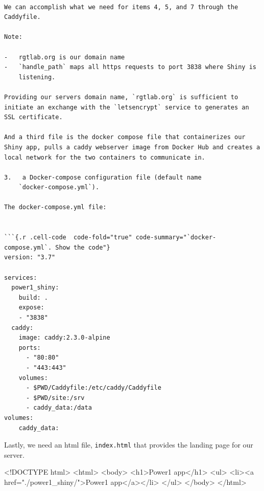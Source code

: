 \documentclass[
  letterpaper,
  DIV=11,
  numbers=noendperiod,
  oneside]{scrartcl}
\newenvironment{Shaded}{\begin{snugshade}}{\end{snugshade}}
\newcommand{\ErrorTok}[1]{\textcolor[rgb]{0.68,0.00,0.00}{#1}}
\newcommand{\NormalTok}[1]{\textcolor[rgb]{0.00,0.23,0.31}{#1}}
\newcommand{\OtherTok}[1]{\textcolor[rgb]{0.00,0.23,0.31}{#1}}
\newcommand{\SpecialCharTok}[1]{\textcolor[rgb]{0.37,0.37,0.37}{#1}}
\newcommand{\StringTok}[1]{\textcolor[rgb]{0.13,0.47,0.30}{#1}}
\begin{document}
\begin{verbatim}

We can accomplish what we need for items 4, 5, and 7 through the
Caddyfile.

Note:

-   rgtlab.org is our domain name
-   `handle_path` maps all https requests to port 3838 where Shiny is
    listening.

Providing our servers domain name, `rgtlab.org` is sufficient to
initiate an exchange with the `letsencrypt` service to generates an SSL certificate.

And a third file is the docker compose file that containerizes our
Shiny app, pulls a caddy webserver image from Docker Hub and creates a
local network for the two containers to communicate in.

3.   a Docker-compose configuration file (default name
    `docker-compose.yml`).

The docker-compose.yml file:


```{.r .cell-code  code-fold="true" code-summary="`docker-compose.yml`. Show the code"}
version: "3.7"

services:
  power1_shiny:
    build: .
    expose:
    - "3838"
  caddy:
    image: caddy:2.3.0-alpine
    ports:
      - "80:80"
      - "443:443"
    volumes:
      - $PWD/Caddyfile:/etc/caddy/Caddyfile
      - $PWD/site:/srv
      - caddy_data:/data
volumes:
    caddy_data:
\end{verbatim}

Lastly, we need an html file, \texttt{index.html} that provides the
landing page for our server.

\begin{Shaded}
\begin{Highlighting}[]
\SpecialCharTok{\textless{}!}\NormalTok{DOCTYPE html}\SpecialCharTok{\textgreater{}}
\ErrorTok{\textless{}}\NormalTok{html}\SpecialCharTok{\textgreater{}}
  \ErrorTok{\textless{}}\NormalTok{body}\SpecialCharTok{\textgreater{}}
    \ErrorTok{\textless{}}\NormalTok{h1}\SpecialCharTok{\textgreater{}}\NormalTok{Power1 app}\SpecialCharTok{\textless{}}\ErrorTok{/}\NormalTok{h1}\SpecialCharTok{\textgreater{}}
    \ErrorTok{\textless{}}\NormalTok{ul}\SpecialCharTok{\textgreater{}}
      \ErrorTok{\textless{}}\NormalTok{li}\SpecialCharTok{\textgreater{}}\ErrorTok{\textless{}}\NormalTok{a href}\OtherTok{=}\StringTok{"./power1\_shiny/"}\SpecialCharTok{\textgreater{}}\NormalTok{Power1 app}\SpecialCharTok{\textless{}}\ErrorTok{/}\NormalTok{a}\SpecialCharTok{\textgreater{}}\ErrorTok{\textless{}/}\NormalTok{li}\SpecialCharTok{\textgreater{}}
    \ErrorTok{\textless{}/}\NormalTok{ul}\SpecialCharTok{\textgreater{}}
  \ErrorTok{\textless{}/}\NormalTok{body}\SpecialCharTok{\textgreater{}}
\ErrorTok{\textless{}/}\NormalTok{html}\SpecialCharTok{\textgreater{}} 
\end{Highlighting}
\end{Shaded}
\end{document}
